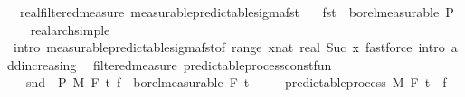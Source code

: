 \begin{isabellebody}
\endisatagproof
{\isafoldproof}%
%
\isadelimproof
\isanewline
%
\endisadelimproof
\isanewline
{}\isamarkupfalse%
\ {\isacharparenleft}{\kern0pt}\ real{\isacharunderscore}{\kern0pt}filtered{\isacharunderscore}{\kern0pt}measure{\isacharparenright}{\kern0pt}\ measurable{\isacharunderscore}{\kern0pt}predictable{\isacharunderscore}{\kern0pt}sigma{\isacharunderscore}{\kern0pt}fst{\isacharcolon}{\kern0pt}\isanewline
\ \ \ {\isachardoublequoteopen}fst\ {\isasymin}\ borel{\isacharunderscore}{\kern0pt}measurable\ {\isasymSigma}\isactrlsub P{\isachardoublequoteclose}\isanewline
%
\isadelimproof
\ \ %
\endisadelimproof
%
\isatagproof
{}\isamarkupfalse%
\ real{\isacharunderscore}{\kern0pt}arch{\isacharunderscore}{\kern0pt}simple\ \isamarkupfalse%
\ {\isacharparenleft}{\kern0pt}intro\ measurable{\isacharunderscore}{\kern0pt}predictable{\isacharunderscore}{\kern0pt}sigma{\isacharunderscore}{\kern0pt}fst{\isacharbrackleft}{\kern0pt}of\ {\isachardoublequoteopen}range\ {\isacharparenleft}{\kern0pt}{\isasymlambda}x{\isacharcolon}{\kern0pt}{\isacharcolon}{\kern0pt}nat{\isachardot}{\kern0pt}\ {\isacharbraceleft}{\kern0pt}{}{\isacharless}{\kern0pt}{\isachardot}{\kern0pt}{\isachardot}{\kern0pt}real\ {\isacharparenleft}{\kern0pt}Suc\ x{\isacharparenright}{\kern0pt}{\isacharbraceright}{\kern0pt}{\isacharparenright}{\kern0pt}{\isachardoublequoteclose}{\isacharbrackright}{\kern0pt}{\isacharparenright}{\kern0pt}\ {\isacharparenleft}{\kern0pt}fastforce\ intro{\isacharcolon}{\kern0pt}\ add{\isacharunderscore}{\kern0pt}increasing{\isacharparenright}{\kern0pt}{\isacharplus}{\kern0pt}%
\endisatagproof
{\isafoldproof}%
%
\isadelimproof
\isanewline
%
\endisadelimproof
\isanewline
\isanewline
\isanewline
{}\isamarkupfalse%
\ {\isacharparenleft}{\kern0pt}\ filtered{\isacharunderscore}{\kern0pt}measure{\isacharparenright}{\kern0pt}\ predictable{\isacharunderscore}{\kern0pt}process{\isacharunderscore}{\kern0pt}const{\isacharunderscore}{\kern0pt}fun{\isacharcolon}{\kern0pt}\isanewline
\ \ \ {\isachardoublequoteopen}snd\ {\isasymin}\ {\isasymSigma}\isactrlsub P\ {\isasymrightarrow}\isactrlsub M\ F\ t\ {\isachardoublequoteopen}f\ {\isasymin}\ borel{\isacharunderscore}{\kern0pt}measurable\ {\isacharparenleft}{\kern0pt}F\ t\isanewline
\ \ \ \ \ {\isachardoublequoteopen}predictable{\isacharunderscore}{\kern0pt}process\ M\ F\ t\ {\isacharparenleft}{\kern0pt}{\isasymlambda}{\isacharunderscore}{\kern0pt}{\isachardot}{\kern0pt}\ f{\isacharparenright}{\kern0pt}{\isachardoublequoteclose}\isanewline

\end{isabellebody}

